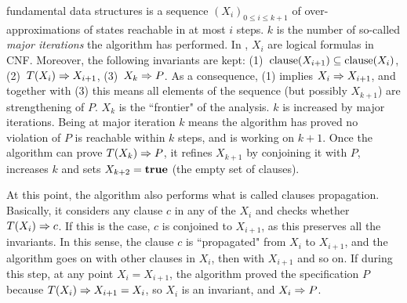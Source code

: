  fundamental data structures is a sequence $(X_i)_{0 \le i \le k + 1}$ of over-approximations of states reachable in at most $i$ steps. $k$ is the number of so-called \emph{major iterations} the algorithm has performed.
In , $X_i$ are logical formulas in CNF. Moreover, the following invariants are kept: (1)~$\text{clause}(X_{i+1}) \subseteq \text{clause}(X_i)$, (2)~$T(X_i) \Rightarrow X_{i+1}$, (3)~$X_{k} \Rightarrow P$.
As a consequence, (1) implies $X_i \Rightarrow X_{i+1}$, and together with (3) this means all elements of the sequence (but possibly $X_{k+1}$) are strengthening of $P$. $X_k$ is the ``frontier" of the analysis. $k$ is increased by major iterations. Being at major iteration $k$ means the algorithm has proved no violation of $P$ is reachable within $k$ steps, and is working on $k + 1$. Once the algorithm can prove $T(X_k) \Rightarrow P$, it refines $X_{k+1}$ by conjoining it with $P$, increases $k$ and sets $X_{k+2} = \textbf{true}$ (the empty set of clauses).

At this point, the algorithm also performs what is called clauses propagation. Basically, it considers any clause $c$ in any of the $X_i$ and checks whether $T(X_i) \Rightarrow c$. If this is the case, $c$ is conjoined to $X_{i+1}$, as this preserves all the invariants. In this sense, the clause $c$ is ``propagated" from $X_i$ to $X_{i+1}$, and the algorithm goes on with other clauses in $X_i$, then with $X_{i+1}$ and so on. If during this step, at any point $X_i = X_{i+1}$, the algorithm proved the specification $P$ because $T(X_i) \Rightarrow X_{i+1} = X_i$, so $X_i$ is an invariant, and $X_i \Rightarrow P$.


